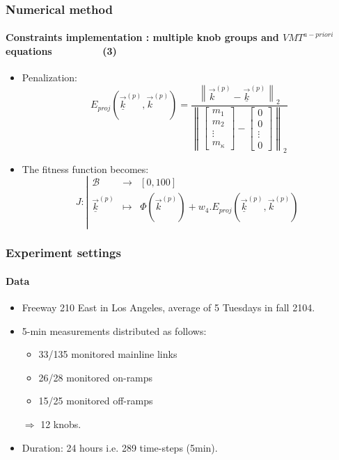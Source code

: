 \documentclass[fleqn]{beamer}
\newcommand\norm[1]{\left\lVert#1\right\rVert}
\begin{document}
\begin{frame}
	\frametitle{Numerical method}
	\framesubtitle{Constraints implementation : multiple knob groups and $VMT^{a-priori}$ equations~~~~~~~~~(3)}
	\begin{itemize}
	 \item Penalization:
	 \begin{equation*}
	E_{proj}(\underline{\vec{k}}^{(p)},\vec{k}^{(p)})=\frac{\norm{\vec{k}^{(p)}-\underline{\vec{k}}^{(p)}}_{2}}{\norm{\begin{bmatrix}m_{1}\\m_{2}\\\vdots\\m_{\kappa}\end{bmatrix}-\begin{bmatrix}0\\0\\\vdots\\0\end{bmatrix}}_{2}}
	\end{equation*}
	\item The fitness function becomes: 
	\begin{equation*}
		J:
		\left|
  		\begin{array}{rcl}
    	\mathscr{B} & \longrightarrow &[0,100] \\
    	\underline{\vec{k}}^{(p)} & \longmapsto &  \Phi(\vec{k}^{(p)})+w_{4}.E_{proj}(\underline{\vec{k}}^{(p)},\vec{k}^{(p)}) \\
  	\end{array}
	\right.
	\end{equation*}
	\end{itemize}
\end{frame}


\begin{frame}
	\frametitle{Experiment settings}
	\framesubtitle{Data}
	\begin{itemize}
		\item Freeway 210 East in Los Angeles, average of 5 Tuesdays in fall 2104.
		\item  5-min measurements distributed as follows:
		\begin{itemize}
			\item 33/135 monitored mainline links
			\item 26/28 monitored on-ramps
			\item 15/25 monitored off-ramps
		\end{itemize}
		$\Rightarrow$ 12 knobs.
		\item Duration: 24 hours i.e.  289 time-steps (5min).
	\end{itemize}
\end{frame}
\end{document}
